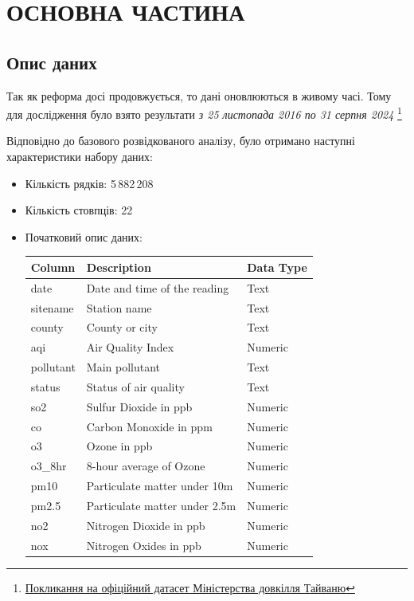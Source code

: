 \documentclass{article}
\begin{document}
    
\newpage
\section{ОСНОВНА ЧАСТИНА}
\subsection{Опис даних}
Так як реформа досі продовжується, то дані оновлюються в живому часі. Тому для дослідження було взято результати \textit{з 25 листопада 2016 по 31 серпня 2024}
\footnote{\href{https://data.moenv.gov.tw/en/dataset/detail/aqx_p_488}{Покликання на офіційний датасет Міністерства довкілля Тайваню}}

Відповідно до базового розвідкованого аналізу, було отримано наступні характеристики набору даних: 

\begin{itemize}
    \item Кількість рядків: 5\,882\,208
    \item Кількість стовпців: 22
    \item Початковий опис даних: 
    \begin{table}[h!]
\centering
\begin{tabular}{|>{\raggedright\arraybackslash}p{3cm}|p{5cm}|p{3cm}|}
\hline
\textbf{Column} & \textbf{Description} & \textbf{Data Type} \\
\hline
date & Date and time of the reading & Text \\
\hline
sitename & Station name & Text \\
\hline
county & County or city & Text \\
\hline
aqi & Air Quality Index & Numeric \\
\hline
pollutant & Main pollutant & Text \\
\hline
status & Status of air quality & Text \\
\hline
so2 & Sulfur Dioxide in ppb & Numeric \\
\hline
co & Carbon Monoxide in ppm & Numeric \\
\hline
o3 & Ozone in ppb & Numeric \\
\hline
o3\_8hr & 8-hour average of Ozone & Numeric \\
\hline
pm10 & Particulate matter under 10m & Numeric \\
\hline
pm2.5 & Particulate matter under 2.5m & Numeric \\
\hline
no2 & Nitrogen Dioxide in ppb & Numeric \\
\hline
nox & Nitrogen Oxides in ppb & Numeric \\

\end{tabular}
\end{table}
\end{itemize}
\end{document}
